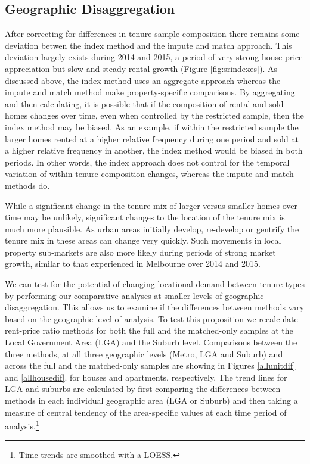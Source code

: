 \documentclass{article}\usepackage[]{graphicx}\usepackage[]{color}
\begin{document}
\subsection*{Geographic Disaggregation}

After correcting for differences in tenure sample composition there remains some deviation betwen the index method and the impute and match approach.  This deviation largely exists during 2014 and 2015, a period of very strong house price appreciation but slow and steady rental growth (Figure \ref{fig:srindexes}). As discussed above, the index method uses an aggregate approach whereas the impute and match method make property-specific comparisons. By aggregating and then calculating, it is possible that if the composition of rental and sold homes changes over time, even when controlled by the restricted sample, then the index method may be biased.  As an example, if within the restricted sample the larger homes rented at a higher relative frequency during one period and sold at a higher relative frequency in another, the index method would be biased in both periods.  In other words, the index approach does not control for the temporal variation of within-tenure composition changes, whereas the impute and match methods do.\par

While a significant change in the tenure mix of larger versus smaller homes over time may be unlikely, significant changes to the location of the tenure mix is much more plausible.  As urban areas initially develop, re-develop or gentrify the tenure mix in these areas can change very quickly.  Such movements in local property sub-markets are also more likely during periods of strong market growth, similar to that experienced in Melbourne over 2014 and 2015.\par

We can test for the potential of changing locational demand between tenure types by performing our comparative analyses at smaller levels of geographic disaggregation.  This allows us to examine if the differences between methods vary based on the geographic level of analysis.  To test this proposition we recalculate rent-price ratio methods for both the full and the matched-only samples at the Local Government Area (LGA) and the Suburb level.  Comparisons between the three methods, at all three geographic levels (Metro, LGA and Suburb) and across the full and the matched-only samples are showing in Figures \ref{allunitdif} and \ref{allhousedif}. for houses and apartments, respectively. The trend lines for LGA and suburbs are calculated by first comparing the differences between methods in each individual geographic area (LGA or Suburb) and then taking a measure of central tendency of the area-specific values at each time period of analysis.\footnote{Time trends are smoothed with a LOESS.}\par
\end{document}
